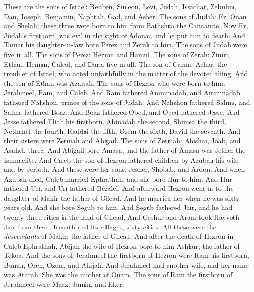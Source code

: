 \begin{biblechapter} %
 These are the sons of Israel: Reuben, Simeon, Levi, Judah, Issachar, Zebulun,
\verse Dan, Joseph, Benjamin, Naphtali, Gad, and Asher.
\verse The sons of Judah: Er, Onan and Shelah; these three were born to him from Bathshua the Canaanite. Now Er, Judah’s firstborn, was evil in the sight of Adonai, and he put him to death.
\verse And Tamar his daughter-in-law bore Perez and Zerah to him. The sons of Judah were five in all.
\verse The sons of Perez: Hezron and Hamul.
\verse The sons of Zerah: Zimri, Ethan, Heman, Calcol, and Dara, five in all.
\verse The son of Carmi: Achar, the troubler of Israel, who acted unfaithfully in the matter of the devoted thing.
\verse And the son of Ethan was Azariah.
\verse The sons of Hezron who were born to him: Jerahmeel, Ram, and Caleb.
\verse And Ram fathered Amminadab, and Amminadab fathered Nahshon, prince of the sons of Judah.
\verse And Nahshon fathered Salma, and Salma fathered Boaz.
\verse And Boaz fathered Obed, and Obed fathered Jesse.
\verse And Jesse fathered Eliab his firstborn, Abinadab the second, Shimea the third,
\verse Nethanel the fourth, Raddai the fifth,
\verse Ozem the sixth, David the seventh.
\verse And their sisters were Zeruiah and Abigail. The sons of Zeruiah: Abishai, Joab, and Asahel, three.
\verse And Abigail bore Amasa, and the father of Amasa was Jether the Ishmaelite.
\verse And Caleb the son of Hezron fathered children by Azubah his wife and by Jerioth. And these were her sons: Jesher, Shobab, and Ardon.
\verse And when Azubah died, Caleb married Ephrathah, and she bore Hur to him.
\verse And Hur fathered Uri, and Uri fathered Bezalel.
\verse And afterward Hezron went in to the daughter of Makir the father of Gilead. And he married her when he was sixty years old. And she bore Segub to him.
\verse And Segub fathered Jair, and he had twenty-three cities in the land of Gilead.
\verse And Geshur and Aram took Havvoth-Jair from them, Kenath and its villages, sixty cities. All these were the \textit{descendants} of Makir, the father of Gilead.
\verse And after the death of Hezron in Caleb-Ephrathah, Abijah the wife of Hezron bore to him Ashhur, the father of Tekoa.
\verse And the sons of Jerahmeel the firstborn of Hezron were Ram his firstborn, Bunah, Oren, Ozem, and Ahijah.
\verse And Jerahmeel had another wife, and her name was Atarah. She was the mother of Onam.
\verse The sons of Ram the firstborn of Jerahmeel were Maaz, Jamin, and Eker.

\end{biblechapter}
